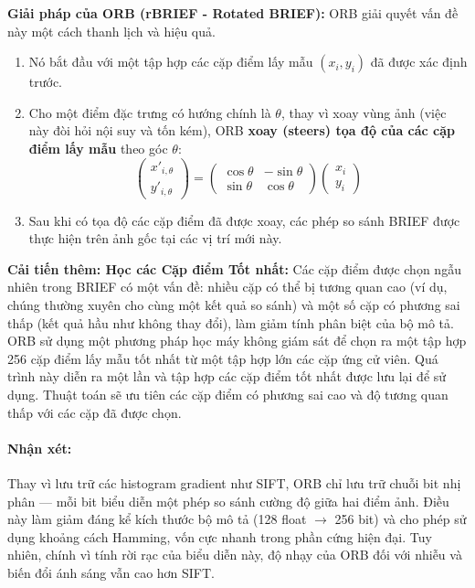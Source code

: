\textbf{Giải pháp của ORB (rBRIEF - Rotated BRIEF):} ORB giải quyết vấn đề này một cách thanh lịch và hiệu quả.
\begin{enumerate}
    \item Nó bắt đầu với một tập hợp các cặp điểm lấy mẫu $(x_i, y_i)$ đã được xác định trước.
    \item Cho một điểm đặc trưng có hướng chính là $\theta$, thay vì xoay vùng ảnh (việc này đòi hỏi nội suy và tốn kém), ORB \textbf{xoay (steers) tọa độ của các cặp điểm lấy mẫu} theo góc $\theta$:
    \begin{equation}
        \begin{pmatrix} x'_{i,\theta} \\ y'_{i,\theta} \end{pmatrix} = \begin{pmatrix} \cos\theta & -\sin\theta \\ \sin\theta & \cos\theta \end{pmatrix} \begin{pmatrix} x_i \\ y_i \end{pmatrix}
    \end{equation}
    \item Sau khi có tọa độ các cặp điểm đã được xoay, các phép so sánh BRIEF được thực hiện trên ảnh gốc tại các vị trí mới này.
\end{enumerate}

\textbf{Cải tiến thêm: Học các Cặp điểm Tốt nhất:} Các cặp điểm được chọn ngẫu nhiên trong BRIEF có một vấn đề: nhiều cặp có thể bị tương quan cao (ví dụ, chúng thường xuyên cho cùng một kết quả so sánh) và một số cặp có phương sai thấp (kết quả hầu như không thay đổi), làm giảm tính phân biệt của bộ mô tả. ORB sử dụng một phương pháp học máy không giám sát để chọn ra một tập hợp 256 cặp điểm lấy mẫu tốt nhất từ một tập hợp lớn các cặp ứng cử viên. Quá trình này diễn ra một lần và tập hợp các cặp điểm tốt nhất được lưu lại để sử dụng. Thuật toán sẽ ưu tiên các cặp điểm có phương sai cao và độ tương quan thấp với các cặp đã được chọn.

\paragraph{Nhận xét:} 
Thay vì lưu trữ các histogram gradient như SIFT, ORB chỉ lưu trữ chuỗi bit nhị phân — mỗi bit biểu diễn một phép so sánh cường độ giữa hai điểm ảnh. 
Điều này làm giảm đáng kể kích thước bộ mô tả (128 float $\rightarrow$ 256 bit) và cho phép sử dụng khoảng cách Hamming, vốn cực nhanh trong phần cứng hiện đại. 
Tuy nhiên, chính vì tính rời rạc của biểu diễn này, độ nhạy của ORB đối với nhiễu và biến đổi ánh sáng vẫn cao hơn SIFT.

